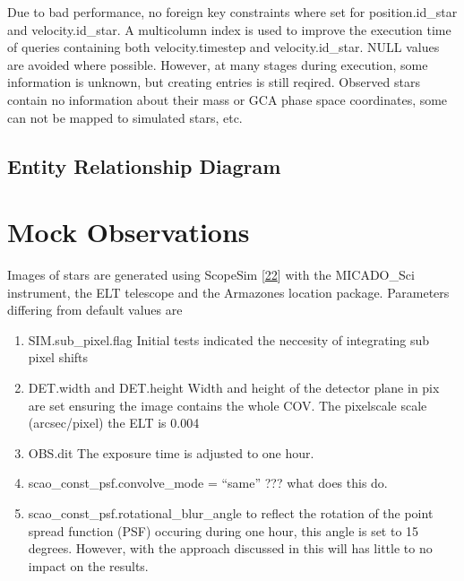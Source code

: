 \documentclass[letterpaper,10pt,english]{sphinxmanual}
\begin{document}
\sphinxAtStartPar
Due to bad performance, no foreign key constraints where set for position.id\_star and velocity.id\_star.
A multi\sphinxhyphen{}column index is used to improve the execution time of queries containing both velocity.timestep and velocity.id\_star.
NULL values are avoided where possible. However, at many stages during execution, some information is unknown, but creating entries is still reqired.
Observed stars contain no information about their mass or GCA phase space coordinates, some can not be mapped to simulated stars, etc.


\section{Entity Relationship Diagram}
\label{\detokenize{NBodySimulation/Database:entity-relationship-diagram}}
\noindent{}


\chapter{Mock Observations}
\label{\detokenize{NBodySimulation/MockObservations:mock-observations}}\label{\detokenize{NBodySimulation/MockObservations::doc}}
\sphinxAtStartPar
Images of stars are generated using ScopeSim {[}\hyperlink{cite.NBodySimulation/Appendix:id50}{22}{]} with the MICADO\_Sci instrument, the ELT telescope and the Armazones location package.
Parameters differing from default values are
\begin{enumerate}
%
\item {} 
\sphinxAtStartPar
SIM.sub\_pixel.flag \sphinxhyphen{} Initial tests indicated the neccesity of integrating sub pixel shifts

\item {} 
\sphinxAtStartPar
DET.width and DET.height \sphinxhyphen{} Width and height of the detector plane in pix are set ensuring the image contains the whole COV. The pixelscale scale (arcsec/pixel) the ELT is 0.004

\item {} 
\sphinxAtStartPar
OBS.dit \sphinxhyphen{} The exposure time is adjusted to one hour.

\item {} 
\sphinxAtStartPar
scao\_const\_psf.convolve\_mode = “same” ??? what does this do.

\item {} 
\sphinxAtStartPar
scao\_const\_psf.rotational\_blur\_angle \sphinxhyphen{} to reflect the rotation of the point spread function (PSF) occuring during one hour, this angle is set to 15 degrees. However, with the approach discussed in {\hyperref[\detokenize{NBodySimulation/DataReduction:masking-bright-stars-label}]{}} this will has little to no impact on the results.

\end{enumerate}
\end{document}
